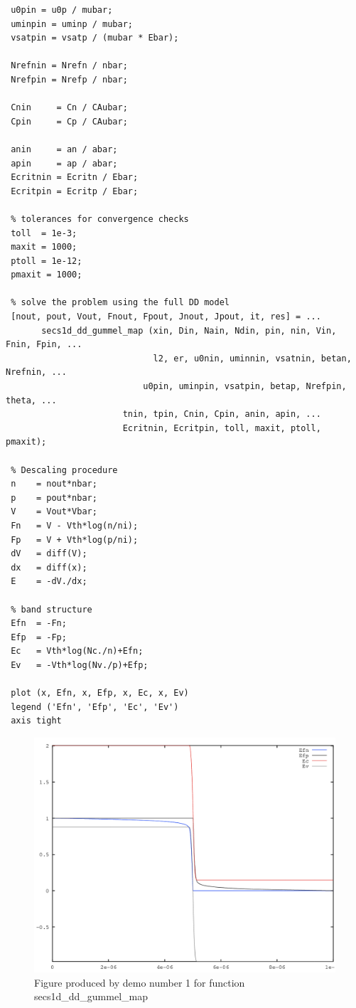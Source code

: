 \begin{verbatim}
 u0pin = u0p / mubar;
 uminpin = uminp / mubar;
 vsatpin = vsatp / (mubar * Ebar);
 
 Nrefnin = Nrefn / nbar;
 Nrefpin = Nrefp / nbar;
 
 Cnin     = Cn / CAubar;
 Cpin     = Cp / CAubar;
 
 anin     = an / abar;
 apin     = ap / abar;
 Ecritnin = Ecritn / Ebar;
 Ecritpin = Ecritp / Ebar;
 
 % tolerances for convergence checks
 toll  = 1e-3;
 maxit = 1000;
 ptoll = 1e-12;
 pmaxit = 1000;
 
 % solve the problem using the full DD model
 [nout, pout, Vout, Fnout, Fpout, Jnout, Jpout, it, res] = ...
       secs1d_dd_gummel_map (xin, Din, Nain, Ndin, pin, nin, Vin, Fnin, Fpin, ...
                             l2, er, u0nin, uminnin, vsatnin, betan, Nrefnin, ...
 	                       u0pin, uminpin, vsatpin, betap, Nrefpin, theta, ...
 		               tnin, tpin, Cnin, Cpin, anin, apin, ...
 		               Ecritnin, Ecritpin, toll, maxit, ptoll, pmaxit); 
 
 % Descaling procedure
 n    = nout*nbar;
 p    = pout*nbar;
 V    = Vout*Vbar;
 Fn   = V - Vth*log(n/ni);
 Fp   = V + Vth*log(p/ni);
 dV   = diff(V);
 dx   = diff(x);
 E    = -dV./dx;
 
 % band structure
 Efn  = -Fn;
 Efp  = -Fp;
 Ec   = Vth*log(Nc./n)+Efn;
 Ev   = -Vth*log(Nv./p)+Efp;
 
 plot (x, Efn, x, Efp, x, Ec, x, Ev)
 legend ('Efn', 'Efp', 'Ec', 'Ev')
 axis tight
\end{verbatim}

\begin{figure}\centering
\includegraphics[width=.7\linewidth]{function/images/secs1d_dd_gummel_map_205.png}
\caption{Figure produced by demo number 1 for function secs1d\_dd\_gummel\_map}
\label{fig:secs1d_dd_gummel_map_figure_1}
\end{figure}
\clearpage
